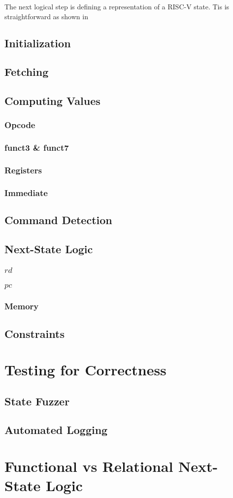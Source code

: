 The next logical step is defining a representation of a RISC-V state. Tis is straightforward as shown in 


\subsection{Initialization}
\subsection{Fetching}
\subsection{Computing Values}
\subsubsection{Opcode}
\subsubsection{funct3 \& funct7}
\subsubsection{Registers}
\subsubsection{Immediate}
\subsection{Command Detection}
\subsection{Next-State Logic}
\subsubsection{$rd$}
\subsubsection{$pc$}
\subsubsection{Memory}
\subsection{Constraints}
\section{Testing for Correctness}
\subsection{State Fuzzer}
\subsection{Automated Logging}

\section{Functional vs Relational Next-State Logic}\label{sec:funcVSrel}